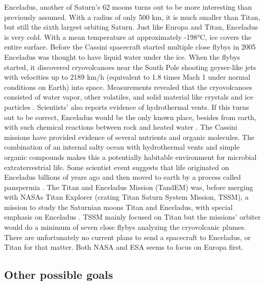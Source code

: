Enceladus, another of Saturn’s 62 moons turns out to be more interesting than previously assumed.
With a radius of only 500 km, it is much smaller than Titan, but still the sixth largest orbiting Saturn.
Just like Europa and Titan, Enceladus is very cold.
With a mean temperature at approximately -198°C, ice covers the entire surface.
Before the Cassini spacecraft started multiple close flybys in 2005 Enceladus was thought to have liquid water under the ice.
When the flybys started, it discovered cryovolcanoes near the South Pole shooting geyser-like jets with velocities up to 2189 km/h (equivalent to 1.8 times Mach 1 under normal conditions on Earth) into space.
Measurements revealed that the cryovolcanoes consisted of water vapor, other volatiles, and solid material like crystals and ice particles \cite{FPlan08}.
Scientists’ also reports evidence of hydrothermal vents.
If this turns out to be correct, Enceladus would be the only known place, besides from earth, with such chemical reactions between rock and heated water \cite{FPlan09}.
The Cassini missions have provided evidence of several nutrients and organic molecules.
The combination of an internal salty ocean with hydrothermal vents and simple organic compounds makes this a potentially habitable environment for microbial extraterrestrial life.
Some scientist event suggests that life originated on Enceladus billions of years ago and then moved to earth by a process called panspermia \cite{FPlan08}.
The Titan and Enceladus Mission (TandEM) was, before merging with NASAs Titan Explorer (crating Titan Saturn System Mission, TSSM), a mission to study the Saturnian moons Titan and Enceladus, with special emphasis on Enceladus \cite{FPlan11}.
TSSM mainly focused on Titan but the missions’ orbiter would do a minimum of seven close flybys analyzing the cryovolcanic plumes.
There are unfortunately no current plans to send a spacecraft to Enceladus, or Titan for that matter.
Both NASA and ESA seems to focus on Europa first.

\subsection*{Other possible goals}

